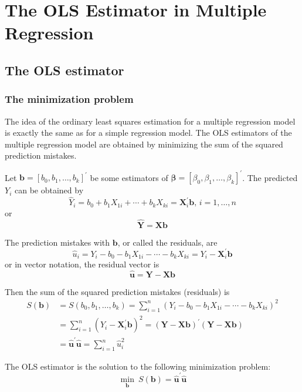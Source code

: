 \documentclass[a4paper,11pt]{article}
\begin{document}
\section{The OLS Estimator in Multiple Regression}
\label{sec:orge3bca9a}
\subsection{The OLS estimator}
\label{sec:org6cbdab2}
\subsubsection*{The minimization problem}
\label{sec:org0ea01f6}
The idea of the ordinary least squares estimation for a multiple
regression model is exactly the same as for a simple regression
model. The OLS estimators of the multiple regression model are obtained by
minimizing the sum of the squared prediction mistakes.

Let \(\mathbf{b} = [b_0, b_1, \ldots, b_k]^{\prime}\) be some estimators of
\(\boldsymbol{\beta} = [\beta_0, \beta_1, \ldots,
\beta_k]^{\prime}\). The predicted \(Y_i\) can be obtained by
\[ \hat{Y}_i = b_0 + b_1 X_{1i} + \cdots + b_k X_{ki} = \mathbf{X}^{\prime}_i
\mathbf{b},\, i = 1, \ldots, n \]
or
\[ \hat{\mathbf{Y}} = \mathbf{Xb} \]

The prediction mistakes with \(\mathbf{b}\), or called the residuals, are
\[ \hat{u}_i = Y_i - b_0 - b_1 X_{1i} - \cdots - b_k X_{ki} = Y_i -
\mathbf{X}^{\prime}_i \mathbf{b} \]
or in vector notation, the residual vector is
\[ \hat{\mathbf{u}} = \mathbf{Y} - \mathbf{Xb} \]

Then the sum of the squared prediction mistakes (residuals) is
\begin{align*}
S(\mathbf{b}) & = S(b_0, b_1, \ldots, b_k) = \sum_{i=1}^n (Y_i - b_0 - b_1 X_{1i} - \cdots - b_k X_{ki})^2 \\
& = \sum_{i=1}^n (Y_i - \mathbf{X}^{\prime}_i \mathbf{b})^2 = (\mathbf{Y} -
\mathbf{Xb})^{\prime}(\mathbf{Y}-\mathbf{Xb}) \\
& = \hat{\mathbf{u}}^{\prime} \hat{\mathbf{u}} = \sum_{i=1}^n \hat{u}_i^2
\end{align*}

The OLS estimator is the solution to the following minimization problem:
\begin{equation}
\label{eq:ols-multi-regress}
\operatorname*{min}_{\mathbf{b}}\: S(\mathbf{b}) = \hat{\mathbf{u}}^{\prime} \hat{\mathbf{u}}
\end{equation}
\end{document}
